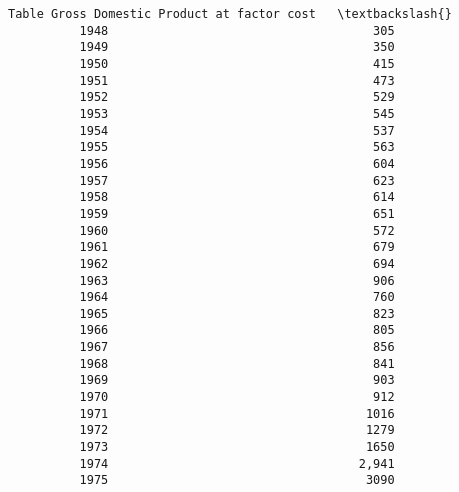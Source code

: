\documentclass[11pt]{article}
\begin{document}
\begin{Verbatim}[commandchars=\\\{\}]
          Table Gross Domestic Product at factor cost   \textbackslash{}
          1948                                     305   
          1949                                     350   
          1950                                     415   
          1951                                     473   
          1952                                     529   
          1953                                     545   
          1954                                     537   
          1955                                     563   
          1956                                     604   
          1957                                     623   
          1958                                     614   
          1959                                     651   
          1960                                     572   
          1961                                     679   
          1962                                     694   
          1963                                     906   
          1964                                     760   
          1965                                     823   
          1966                                     805   
          1967                                     856   
          1968                                     841   
          1969                                     903   
          1970                                     912   
          1971                                    1016   
          1972                                    1279   
          1973                                    1650   
          1974                                   2,941   
          1975                                    3090   
          

\end{Verbatim}
\end{document}
